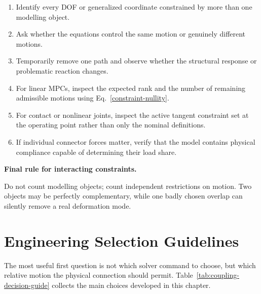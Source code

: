 \begin{enumerate}
    \item Identify every DOF or generalized coordinate constrained by more than
          one modelling object.
    \item Ask whether the equations control the same motion or genuinely
          different motions.
    \item Temporarily remove one path and observe whether the structural response
          or problematic reaction changes.
    \item For linear MPCs, inspect the expected rank and the number of remaining
          admissible motions using Eq.~\eqref{constraint-nullity}.
    \item For contact or nonlinear joints, inspect the active tangent constraint
          set at the operating point rather than only the nominal definitions.
    \item If individual connector forces matter, verify that the model contains
          physical compliance capable of determining their load share.
\end{enumerate}

\begin{bbox}
\textbf{Final rule for interacting constraints.}

Do not count modelling objects; count independent restrictions on motion. Two
objects may be perfectly complementary, while one badly chosen overlap can
silently remove a real deformation mode.
\end{bbox}

\clearpage
\section{Engineering Selection Guidelines}\label{sec:coupling-selection-guidelines}

The most useful first question is not which solver command to choose, but which
relative motion the physical connection should permit. Table~\ref{tab:coupling-decision-guide}
collects the main choices developed in this chapter.

